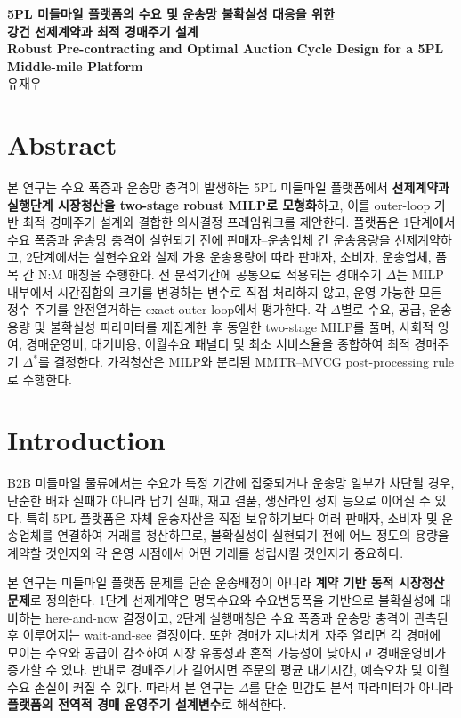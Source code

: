 \documentclass[11pt,a4paper]{article}
\newcommand{\hl}[1]{\textbf{\color{blue!55!black}#1}}
\begin{document}
\begin{center}
{\Large \textbf{5PL 미들마일 플랫폼의 수요 및 운송망 불확실성 대응을 위한 \\ 강건 선제계약과 최적 경매주기 설계}}\\
{\normalsize \textbf{Robust Pre-contracting and Optimal Auction Cycle Design for a 5PL Middle-mile Platform}}\\[5pt]
유재우
\end{center}

\section{Abstract}
본 연구는 수요 폭증과 운송망 충격이 발생하는 5PL 미들마일 플랫폼에서 \hl{선제계약과 실행단계 시장청산을 two-stage robust MILP로 모형화}하고, 이를 outer-loop 기반 최적 경매주기 설계와 결합한 의사결정 프레임워크를 제안한다. 플랫폼은 1단계에서 수요 폭증과 운송망 충격이 실현되기 전에 판매자--운송업체 간 운송용량을 선제계약하고, 2단계에서는 실현수요와 실제 가용 운송용량에 따라 판매자, 소비자, 운송업체, 품목 간 N:M 매칭을 수행한다. 전 분석기간에 공통으로 적용되는 경매주기 $\Delta$는 MILP 내부에서 시간집합의 크기를 변경하는 변수로 직접 처리하지 않고, 운영 가능한 모든 정수 주기를 완전열거하는 exact outer loop에서 평가한다. 각 $\Delta$별로 수요, 공급, 운송용량 및 불확실성 파라미터를 재집계한 후 동일한 two-stage MILP를 풀며, 사회적 잉여, 경매운영비, 대기비용, 이월수요 패널티 및 최소 서비스율을 종합하여 최적 경매주기 $\Delta^*$를 결정한다. 가격청산은 MILP와 분리된 MMTR--MVCG post-processing rule로 수행한다.

\section{Introduction}
B2B 미들마일 물류에서는 수요가 특정 기간에 집중되거나 운송망 일부가 차단될 경우, 단순한 배차 실패가 아니라 납기 실패, 재고 결품, 생산라인 정지 등으로 이어질 수 있다. 특히 5PL 플랫폼은 자체 운송자산을 직접 보유하기보다 여러 판매자, 소비자 및 운송업체를 연결하여 거래를 청산하므로, 불확실성이 실현되기 전에 어느 정도의 용량을 계약할 것인지와 각 운영 시점에서 어떤 거래를 성립시킬 것인지가 중요하다.

본 연구는 미들마일 플랫폼 문제를 단순 운송배정이 아니라 \hl{계약 기반 동적 시장청산 문제}로 정의한다. 1단계 선제계약은 명목수요와 수요변동폭을 기반으로 불확실성에 대비하는 here-and-now 결정이고, 2단계 실행매칭은 수요 폭증과 운송망 충격이 관측된 후 이루어지는 wait-and-see 결정이다. 또한 경매가 지나치게 자주 열리면 각 경매에 모이는 수요와 공급이 감소하여 시장 유동성과 혼적 가능성이 낮아지고 경매운영비가 증가할 수 있다. 반대로 경매주기가 길어지면 주문의 평균 대기시간, 예측오차 및 이월수요 손실이 커질 수 있다. 따라서 본 연구는 $\Delta$를 단순 민감도 분석 파라미터가 아니라 \hl{플랫폼의 전역적 경매 운영주기 설계변수}로 해석한다.
\end{document}
